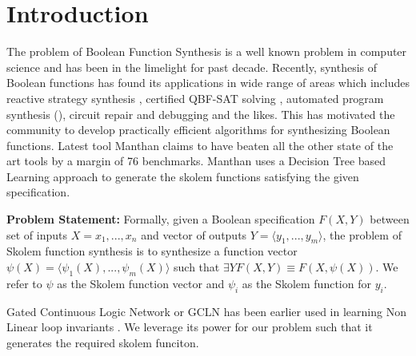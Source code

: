 
\section{Introduction}
\label{sec:intro}

The problem of Boolean Function Synthesis is a well known problem in computer science and 
has been in the limelight for past decade. Recently, synthesis of Boolean functions has 
found its applications in wide range of areas which includes reactive strategy synthesis 
\cite{Alur2005}, certified QBF-SAT solving \cite{Balabnav2012}, 
automated program synthesis (\cite{Solar2013, Gulwani2013}), circuit repair and debugging 
\cite{Jo} and the likes. This has motivated the community to develop practically efficient 
algorithms for synthesizing Boolean functions. Latest tool Manthan \cite{Manthan} claims 
to have beaten all the other state of the art tools by a margin of 76 benchmarks.
Manthan uses a Decision Tree based Learning approach to generate the skolem functions 
satisfying the given specification.

\smallskip
\noindent\textbf{Problem Statement:} Formally, 
given a Boolean specification $F(X, Y)$ between set of
inputs $X = {x_1, . . . , x_n}$ and vector of outputs $Y = \langle y_1, . . . , y_m \rangle$, the problem of
Skolem function synthesis is to synthesize a function vector $\psi(X) = \langle \psi_1(X), . . . , \psi_m(X)\rangle$
such that $\exists Y F(X, Y ) \equiv F(X, \psi(X))$. We refer to $\psi$ as the Skolem
function vector and $\psi_i$ as the Skolem function for $y_i$.

\smallskip
Gated Continuous Logic Network or GCLN has been earlier used in learning Non Linear loop 
invariants \cite{gcln}. We leverage its power for our problem such that it generates the 
required skolem funciton.


